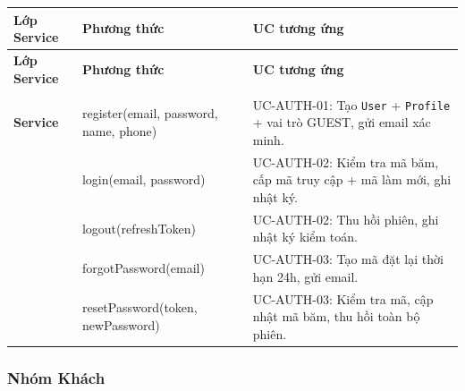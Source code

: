 \begingroup
\renewcommand{\arraystretch}{1.3}
\begin{longtable}{|>{\centering\arraybackslash}m{2.8cm}|>{\sloppy\small\ttfamily\raggedright\arraybackslash}p{7cm}|>{\raggedright\arraybackslash}m{4.5cm}|}
\hline
\textbf{Lớp Service} & \normalfont\normalsize\textbf{Phương thức} & \textbf{UC tương ứng} \\ \hline
\endfirsthead
\hline
\textbf{Lớp Service} & \normalfont\normalsize\textbf{Phương thức} & \textbf{UC tương ứng} \\ \hline
\endhead
\hline
\endfoot

\multirow{5}{*}{\makecell{\textbf{Auth}\\\textbf{Service}}} &
  register(email, password, name, phone) &
  UC-AUTH-01: Tạo \texttt{User} + \texttt{Profile} + vai trò GUEST, gửi email xác minh. \\ \cline{2-3}
& login(email, password) &
  UC-AUTH-02: Kiểm tra mã băm, cấp mã truy cập + mã làm mới, ghi nhật ký. \\ \cline{2-3}
& logout(refreshToken) &
  UC-AUTH-02: Thu hồi phiên, ghi nhật ký kiểm toán. \\ \cline{2-3}
& forgotPassword(email) &
  UC-AUTH-03: Tạo mã đặt lại thời hạn 24h, gửi email. \\ \cline{2-3}
& resetPassword(token, newPassword) &
  UC-AUTH-03: Kiểm tra mã, cập nhật mã băm, thu hồi toàn bộ phiên. \\ \hline

\end{longtable}
\endgroup

\subsubsection*{Nhóm Khách}

